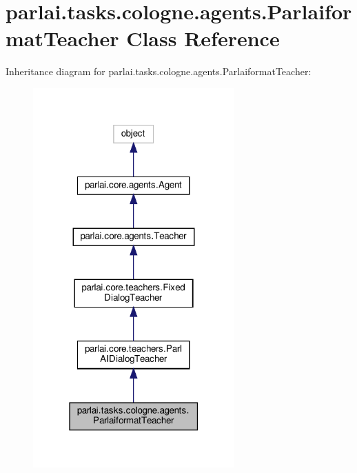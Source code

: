 \hypertarget{classparlai_1_1tasks_1_1cologne_1_1agents_1_1ParlaiformatTeacher}{}\section{parlai.\+tasks.\+cologne.\+agents.\+Parlaiformat\+Teacher Class Reference}
\label{classparlai_1_1tasks_1_1cologne_1_1agents_1_1ParlaiformatTeacher}


Inheritance diagram for parlai.\+tasks.\+cologne.\+agents.\+Parlaiformat\+Teacher\+:
\nopagebreak
\begin{figure}[H]
\begin{center}
\leavevmode
\includegraphics[width=219pt]{classparlai_1_1tasks_1_1cologne_1_1agents_1_1ParlaiformatTeacher__inherit__graph}
\end{center}
\end{figure}


